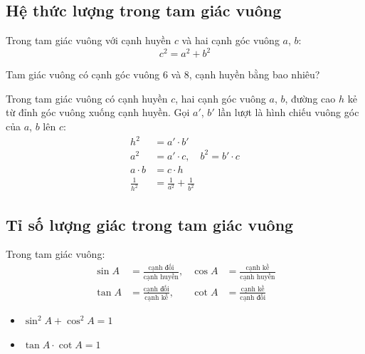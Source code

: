 \documentclass[12pt,a4paper]{article}
\begin{document}
\subsection{Hệ thức lượng trong tam giác vuông}

\begin{dinhly}[title={Định lý Pythagore}]
  Trong tam giác vuông với cạnh huyền $c$ và hai cạnh góc vuông $a$, $b$:
  \[c^2 = a^2 + b^2\]
\end{dinhly}

\begin{vidu}
  Tam giác vuông có cạnh góc vuông $6$ và $8$, cạnh huyền bằng bao nhiêu?
\end{vidu}

\begin{congthuc}[title={Hệ thức lượng}]
  Trong tam giác vuông có cạnh huyền $c$, hai cạnh góc vuông $a$, $b$, đường cao $h$ kẻ từ đỉnh góc vuông xuống cạnh huyền. Gọi $a'$, $b'$ lần lượt là hình chiếu vuông góc của $a$, $b$ lên $c$:
  \begin{align*}
    h^2 &= a' \cdot b' \\
    a^2 &= a' \cdot c, \quad b^2 = b' \cdot c \\
    a \cdot b &= c \cdot h \\
    \frac{1}{h^2} &= \frac{1}{a^2} + \frac{1}{b^2}
  \end{align*}
\end{congthuc}

\subsection{Tỉ số lượng giác trong tam giác vuông}

\begin{dinhnghia}
  Trong tam giác vuông:
  \begin{align*}
    \sin A &= \frac{\text{cạnh đối}}{\text{cạnh huyền}}, &
    \cos A &= \frac{\text{cạnh kề}}{\text{cạnh huyền}} \\[6pt]
    \tan A &= \frac{\text{cạnh đối}}{\text{cạnh kề}}, &
    \cot A &= \frac{\text{cạnh kề}}{\text{cạnh đối}}
  \end{align*}
\end{dinhnghia}

\begin{congthuc}
  \begin{itemize}
    \item $\sin^2 A + \cos^2 A = 1$
    \item $\tan A \cdot \cot A = 1$
  \end{itemize}
\end{congthuc}
\end{document}
